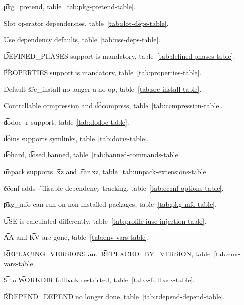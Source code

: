 \begin{compactitem}
\item \t{pkg\_pretend}, table~\ref{tab:pkg-pretend-table}.
\item Slot operator dependencies, table~\ref{tab:slot-deps-table}.
\item Use dependency defaults, table~\ref{tab:use-deps-table}.
\item \t{DEFINED\_PHASES} support is mandatory, table~\ref{tab:defined-phases-table}.
\item \t{PROPERTIES} support is mandatory, table~\ref{tab:properties-table}.
\item Default \t{src\_install} no longer a no-op, table~\ref{tab:src-install-table}.
\item Controllable compression and \t{docompress}, table~\ref{tab:compression-table}.
\item \t{dodoc -r} support, table~\ref{tab:dodoc-table}.
\item \t{doins} supports symlinks, table~\ref{tab:doins-table}.
\item \t{dohard}, \t{dosed} banned, table~\ref{tab:banned-commands-table}.
\item \t{unpack} supports \t{.xz} and \t{.tar.xz}, table~\ref{tab:unpack-extensions-table}.
\item \t{econf} adds \t{-{}-disable-dependency-tracking}, table~\ref{tab:econf-options-table}.
\item \t{pkg\_info} can run on non-installed packages, table~\ref{tab:pkg-info-table}.
\item \t{USE} is calculated differently, table~\ref{tab:profile-iuse-injection-table}.
\item \t{AA} and \t{KV} are gone, table~\ref{tab:env-vars-table}.
\item \t{REPLACING\_VERSIONS} and \t{REPLACED\_BY\_VERSION}, table~\ref{tab:env-vars-table}.
\item \t{S} to \t{WORKDIR} fallback restricted, table~\ref{tab:s-fallback-table}.
\item \t{RDEPEND=DEPEND} no longer done, table~\ref{tab:rdepend-depend-table}.
\end{compactitem}


